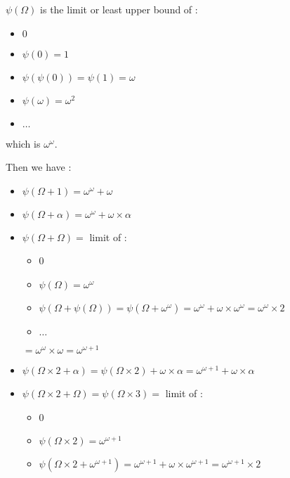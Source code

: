 \documentclass[10pt]{article}
\begin{document}
\( \psi(\Omega) \) is the limit or least upper bound of :

\begin{itemize}
     \setlength{\itemsep}{1pt}
     \setlength{\parskip}{0pt}
     \setlength{\parsep}{0pt}
\item \( 0 \)
\item \( \psi(0) = 1 \)
\item \( \psi(\psi(0)) = \psi(1) = \omega \)
\item \( \psi(\omega) = \omega^2 \)
\item \( \ldots \)
\end{itemize}

which is \( \omega^\omega \).

Then we have :

\begin{itemize}
     \setlength{\itemsep}{1pt}
     \setlength{\parskip}{0pt}
     \setlength{\parsep}{0pt}
\item \( \psi(\Omega+1) = \omega^\omega+\omega \)
\item \( \psi(\Omega+\alpha) = \omega^\omega+\omega \times \alpha \)
\item \( \psi(\Omega+\Omega) = \) limit of : 
   \begin{itemize}
     \setlength{\itemsep}{1pt}
     \setlength{\parskip}{0pt}
     \setlength{\parsep}{0pt}
   \item 0
   \item \( \psi(\Omega) = \omega^\omega \)
   \item \( \psi(\Omega+\psi(\Omega)) = \psi(\Omega+\omega^\omega) = \omega^\omega+\omega \times \omega^\omega = \omega^\omega \times 2 \)
   \item \( \ldots \)
   \end{itemize}
   \( = \omega^\omega \times \omega = \omega^{\omega+1} \)
\item \( \psi(\Omega \times 2 + \alpha) = \psi(\Omega \times 2) + \omega \times \alpha = \omega^{\omega+1} + \omega \times \alpha \)
\item \( \psi(\Omega \times 2 + \Omega) = \psi(\Omega \times 3) = \) limit of : 
   \begin{itemize}
     \setlength{\itemsep}{1pt}
     \setlength{\parskip}{0pt}
     \setlength{\parsep}{0pt}
   \item 0
   \item \( \psi(\Omega \times 2) = \omega^{\omega+1} \)
   \item \( \psi(\Omega \times 2 + \omega^{\omega+1}) = \omega^{\omega+1} + \omega \times \omega^{\omega+1} = \omega^{\omega+1} \times 2 \)

\end{itemize}
\end{itemize}
\end{document}
